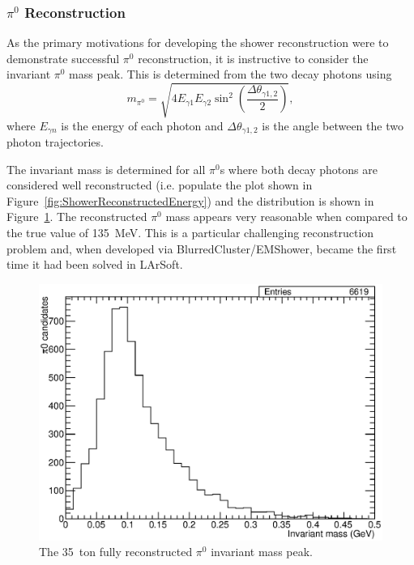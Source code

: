 \subsubsection{$\pi^0$ Reconstruction}\label{sec:pi0Reconstruction}

As the primary motivations for developing the shower reconstruction were to demonstrate successful $\pi^0$ reconstruction, it is instructive to consider the invariant $\pi^0$ mass peak.  This is determined from the two decay photons using
\begin{equation}
  m_{\pi^0} = \sqrt{4 E_{\gamma 1} E_{\gamma 2} \sin^2{\left( \frac{\Delta \theta_{\gamma 1,2}}{2} \right)}},
\end{equation}
where $E_{\gamma n}$ is the energy of each photon and $\Delta \theta_{\gamma 1,2}$ is the angle between the two photon trajectories.

The invariant mass is determined for all $\pi^0$s where both decay photons are considered well reconstructed (i.e. populate the plot shown in Figure~\ref{fig:ShowerReconstructedEnergy}) and the distribution is shown in Figure~\ref{fig:Pi0MassPeak}.  The reconstructed $\pi^0$ mass appears very reasonable when compared to the true value of 135~MeV.  This is a particular challenging reconstruction problem and, when developed via BlurredCluster/EMShower, became the first time it had been solved in LArSoft.

\begin{figure}
  \centering
  \includegraphics[width=12cm]{Pi0MassPeak.eps}
  \caption[The 35~ton fully reconstructed $\pi^0$ invariant mass peak.]{The 35~ton fully reconstructed $\pi^0$ invariant mass peak.}
  \label{fig:Pi0MassPeak}
\end{figure}

